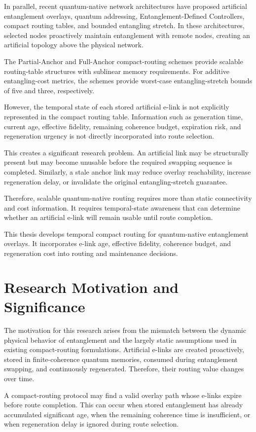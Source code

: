 In parallel, recent quantum-native network architectures have proposed artificial entanglement overlays, quantum addressing, Entanglement-Defined Controllers, compact routing tables, and bounded entangling stretch. In these architectures, selected nodes proactively maintain entanglement with remote nodes, creating an artificial topology above the physical network.

The Partial-Anchor and Full-Anchor compact-routing schemes provide scalable routing-table structures with sublinear memory requirements. For additive entangling-cost metrics, the schemes provide worst-case entangling-stretch bounds of five and three, respectively.

However, the temporal state of each stored artificial e-link is not explicitly represented in the compact routing table. Information such as generation time, current age, effective fidelity, remaining coherence budget, expiration risk, and regeneration urgency is not directly incorporated into route selection.

This creates a significant research problem. An artificial link may be structurally present but may become unusable before the required swapping sequence is completed. Similarly, a stale anchor link may reduce overlay reachability, increase regeneration delay, or invalidate the original entangling-stretch guarantee.

Therefore, scalable quantum-native routing requires more than static connectivity and cost information. It requires temporal-state awareness that can determine whether an artificial e-link will remain usable until route completion.

This thesis develops temporal compact routing for quantum-native entanglement
overlays. It incorporates e-link age, effective fidelity, coherence budget,
and regeneration cost into routing and maintenance decisions.
\section{Research Motivation and Significance}
The motivation for this research arises from the mismatch between the dynamic physical behavior of entanglement and the largely static assumptions used in existing compact-routing formulations. Artificial e-links are created proactively, stored in finite-coherence quantum memories, consumed during entanglement swapping, and continuously regenerated. Therefore, their routing value changes over time.

A compact-routing protocol may find a valid overlay path whose e-links expire before route completion. This can occur when stored entanglement has already accumulated significant age, when the remaining coherence time is insufficient, or when regeneration delay is ignored during route selection.

